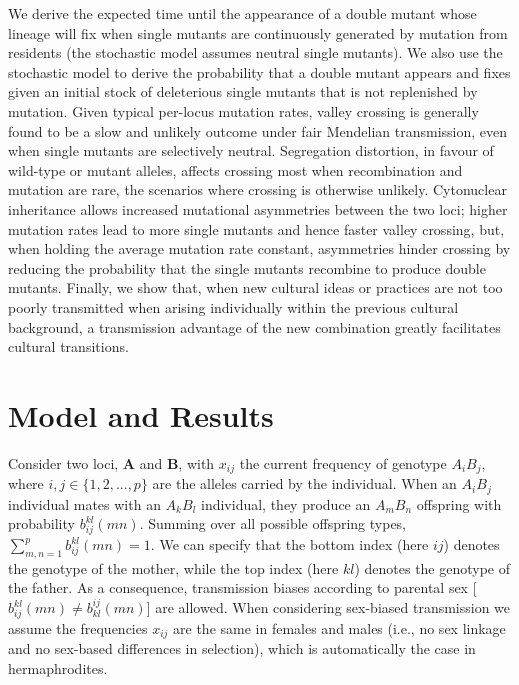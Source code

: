 \documentclass[review,3p,authoryear]{elsarticle}
\begin{document}
We derive the expected time until the appearance of a double mutant whose lineage will fix when single mutants are continuously generated by mutation from residents (the stochastic model assumes neutral single mutants).
We also use the stochastic model to derive the probability that a double mutant appears and fixes given an initial stock of deleterious single mutants that is not replenished by mutation.
Given typical per-locus mutation rates, valley crossing is generally found to be a slow and unlikely outcome under fair Mendelian transmission, even when single mutants are selectively neutral.
Segregation distortion, in favour of wild-type or mutant alleles, affects crossing most when recombination and mutation are rare, the scenarios where crossing is otherwise unlikely.
Cytonuclear inheritance allows increased mutational asymmetries between the two loci; higher mutation rates lead to more single mutants and hence faster valley crossing, but, when holding the average mutation rate constant, asymmetries hinder crossing by reducing the probability that the single mutants recombine to produce double mutants. 
Finally, we show that, when new cultural ideas or practices are not too poorly transmitted when arising individually within the previous cultural background, a transmission advantage of the new combination greatly facilitates cultural transitions. 

\section{Model and Results}

Consider two loci, $\mathbf{A}$ and $\mathbf{B}$, 
with $x_{ij}$ the current frequency of genotype $A_iB_j$, where $i,j\in\{1,2,...,p\}$ are the alleles carried by the individual.
When an $A_iB_j$ individual mates with an $A_kB_l$ individual, they produce an $A_mB_n$ offspring with probability $b_{ij}^{kl}(mn)$.
Summing over all possible offspring types, $\sum_{m,n=1}^p b_{ij}^{kl}(mn) =1$.
We can specify that the bottom index (here $ij$) denotes the genotype of the mother, while the top index (here $kl$) denotes the genotype of the father.
As a consequence, transmission biases according to parental sex [$b_{ij}^{kl}(mn)\neq b_{kl}^{ij}(mn)$] are allowed.
When considering sex-biased transmission we assume the frequencies $x_{ij}$ are the same in females and males (i.e., no sex linkage and no sex-based differences in selection), which is automatically the case in hermaphrodites.
\end{document}
